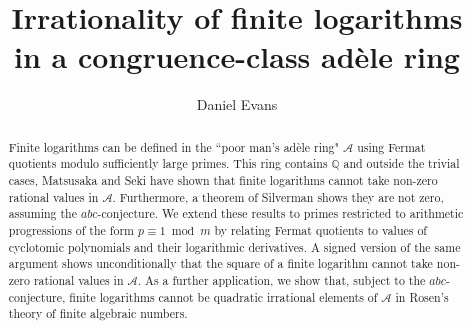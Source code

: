 \documentclass[12pt,reqno]{amsart}
\theoremstyle{remark}
\begin{document}
\title[Irrationality of finite logarithms]{Irrationality of finite logarithms \\in a congruence-class ad\`{e}le ring}
\author{Daniel Evans}
\address{Department of Mathematical Sciences, Durham University, DH1 3LE, United Kingdom}







\begin{abstract}
Finite logarithms can be defined in the ``poor man's ad\`{e}le ring" $\mathcal{A}$ using Fermat quotients modulo sufficiently large primes. This ring contains $\mathbb{Q}$ and outside the trivial cases, Matsusaka and Seki have shown that finite logarithms cannot take non-zero rational values in $\mathcal{A}$. Furthermore, a theorem of Silverman shows they are not zero, assuming the $abc$-conjecture. We extend these results to primes restricted to arithmetic progressions of the form $p\equiv 1\bmod m$ by relating Fermat quotients to values of cyclotomic polynomials and their logarithmic derivatives. A signed version of the same argument shows unconditionally that the square of a finite logarithm cannot take non-zero rational values in $\mathcal{A}$.  
As a further application, we show that, subject to the $abc$-conjecture, finite logarithms cannot be quadratic irrational elements of $\mathcal{A}$ in Rosen's theory of finite algebraic numbers.
\end{abstract}

\maketitle
\end{document}
